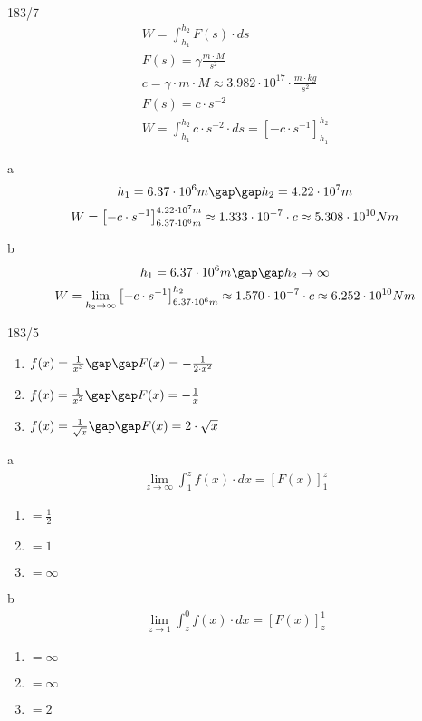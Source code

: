 \begin{exercise}{183/7}
 \begin{gather*}
   W = \int_{h_1}^{h_2} F(s) \cdot ds \\
   F(s) = \gamma \frac{m \cdot M}{s^2} \\
   c = \gamma \cdot m \cdot M \approx 3.982 \cdot 10^{17} \cdot \frac{m \cdot kg}{s^2} \\
   F(s) = c \cdot s^{-2} \\
   W = \int_{h_1}^{h_2} c \cdot s^{-2} \cdot ds = \left[-c \cdot s^{-1}\right]_{h_1}^{h_2}
 \end{gather*}
 \item [a]
 \begin{gather*}
   h_1 = 6.37 \cdot 10^6m \gap\gap h_2 = 4.22 \cdot 10^7m \\
   W = \left[-c \cdot s^{-1}\right]_{6.37 \cdot 10^6m}^{4.22 \cdot 10^7m} \approx 1.333 \cdot 10^{-7} \cdot c \approx 5.308 \cdot 10^{10}Nm
 \end{gather*}
 \item [b]
 \begin{gather*}
   h_1 = 6.37 \cdot 10^6m \gap\gap h_2 \rightarrow \infty \\
   W = \lim\limits_{h_2 \to \infty} \left[-c \cdot s^{-1}\right]_{6.37 \cdot 10^6m}^{h_2} \approx 1.570 \cdot 10^{-7} \cdot c \approx 6.252 \cdot 10^{10}Nm
 \end{gather*}
\end{exercise}
\newpage
\begin{exercise}{183/5}
  \begin{enumerate}[I]
    \item $f(x) = \frac{1}{x^3} \gap\gap F(x) = -\frac{1}{2 \cdot x^2}$
    \item $f(x) = \frac{1}{x^2} \gap\gap F(x) = -\frac{1}{x}$
    \item $f(x) = \frac{1}{\sqrt{x}} \gap\gap F(x) = 2 \cdot \sqrt{x}$
  \end{enumerate}
  \item [a]
  \begin{gather*}
    \lim\limits_{z \to \infty} \int_1^z f(x) \cdot dx = \left[F(x)\right]_1^z
  \end{gather*}
  \begin{enumerate}[I]
    \item $= \frac{1}{2}$
    \item $= 1$
    \item $= \infty$
  \end{enumerate}
  \item [b]
  \begin{gather*}
    \lim\limits_{z \to 1} \int_z^0 f(x) \cdot dx = \left[F(x)\right]_z^1
  \end{gather*}
  \begin{enumerate}[I]
    \item $= \infty$
    \item $= \infty$
    \item $= 2$
  \end{enumerate}
\end{exercise}
